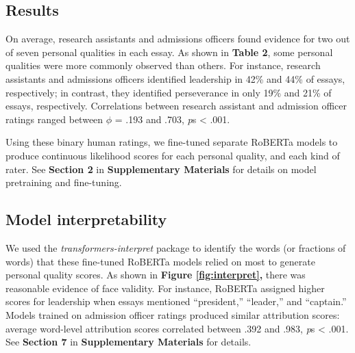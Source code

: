 \documentclass[11pt]{report}
\begin{document}
\begin{mainf}
\section{Results}

On average, research assistants and admissions officers found evidence for two out of seven personal qualities in each essay. As shown in \textbf{Table 2}, some personal qualities were more commonly observed than others. For instance, research assistants and admissions officers identified leadership in 42\% and 44\% of essays, respectively; in contrast, they identified perseverance in only 19\% and 21\% of essays, respectively. Correlations between research assistant and admission officer ratings ranged between $\phi$ = .193 and .703, \textit{p}s < .001.

Using these binary human ratings, we fine-tuned separate RoBERTa models to produce continuous likelihood scores for each personal quality, and each kind of rater. See \textbf{Section 2} in \textbf{Supplementary Materials} for details on model pretraining and fine-tuning.

\subsection{Model interpretability}
We used the \textit{transformers-interpret} package \cite{pierse_transformers_2021,janizek_explaining_2020} to identify the words (or fractions of words) that these fine-tuned RoBERTa models relied on most to generate personal quality scores. 
As shown in \textbf{Figure \ref{fig:interpret},} there was reasonable evidence of face validity. For instance, RoBERTa assigned higher scores for leadership when essays mentioned ``president,'' ``leader,'' and ``captain.'' Models trained on admission officer ratings produced similar attribution scores: average word-level attribution scores correlated between .392 and .983, \textit{p}s < .001.
See \textbf{Section 7} in \textbf{Supplementary Materials} for details.


\end{mainf}
\end{document}
